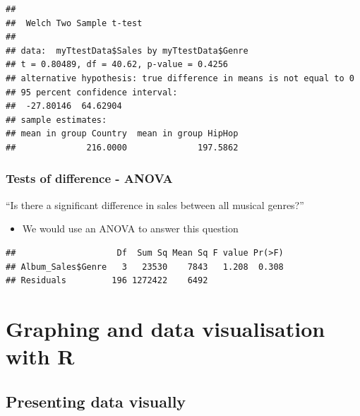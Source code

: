 \documentclass[
]{book}
\newenvironment{Shaded}{\begin{snugshade}}{\end{snugshade}}
\newcommand{\KeywordTok}[1]{\textcolor[rgb]{0.13,0.29,0.53}{\textbf{#1}}}
\newcommand{\NormalTok}[1]{#1}
\newcommand{\OperatorTok}[1]{\textcolor[rgb]{0.81,0.36,0.00}{\textbf{#1}}}
\newcommand{\StringTok}[1]{\textcolor[rgb]{0.31,0.60,0.02}{#1}}
\providecommand{\tightlist}{%
  \setlength{\itemsep}{0pt}\setlength{\parskip}{0pt}}
\begin{document}
\begin{verbatim}
## 
##  Welch Two Sample t-test
## 
## data:  myTtestData$Sales by myTtestData$Genre
## t = 0.80489, df = 40.62, p-value = 0.4256
## alternative hypothesis: true difference in means is not equal to 0
## 95 percent confidence interval:
##  -27.80146  64.62904
## sample estimates:
## mean in group Country  mean in group HipHop 
##              216.0000              197.5862
\end{verbatim}

\hypertarget{tests-of-difference---anova}{%
\subsection{Tests of difference - ANOVA}\label{tests-of-difference---anova}}

``Is there a significant difference in sales between all musical genres?''

\begin{itemize}
\tightlist
\item
  We would use an ANOVA to answer this question
\end{itemize}

\begin{Shaded}
\end{Shaded}

\begin{verbatim}
##                    Df  Sum Sq Mean Sq F value Pr(>F)
## Album_Sales$Genre   3   23530    7843   1.208  0.308
## Residuals         196 1272422    6492
\end{verbatim}

\hypertarget{graphing-and-data-visualisation-with-r}{%
\chapter{Graphing and data visualisation with R}\label{graphing-and-data-visualisation-with-r}}

\hypertarget{presenting-data-visually}{%
\section{Presenting data visually}\label{presenting-data-visually}}
\end{document}
